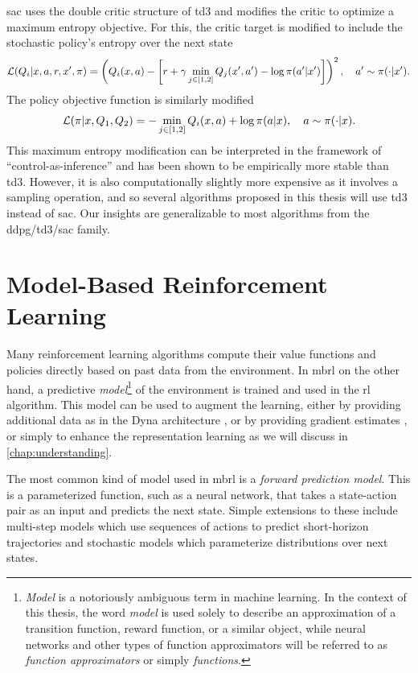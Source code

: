 \ac{sac} uses the double critic structure of \ac{td3} and modifies the critic to optimize a maximum entropy objective.
For this, the critic target is modified to include the stochastic policy's entropy over the next state
\begin{align}
    \mathcal{L}(Q_i| x, a, r, x', \pi) = \left(Q_i(x,a) - \left[r + \gamma \min_{j \in [1,2]}Q_j(x', a') - \log \pi(a'|x')\right]\right)^2, \quad a'\sim\pi(\cdot|x').
\end{align}
The policy objective function is similarly modified
\begin{align}
    \mathcal{L}(\pi| x, Q_1, Q_2) = - \min_{j \in [1,2]} Q_i(x, a) + \log \pi(a|x), \quad a\sim\pi(\cdot|x).
\end{align}
This maximum entropy modification can be interpreted in the framework of ``control-as-inference'' \parencite{levine2018reinforcement} and has been shown to be empirically more stable than \ac{td3}.
However, it is also computationally slightly more expensive as it involves a sampling operation, and so several algorithms proposed in this thesis will use \ac{td3} instead of \ac{sac}.
Our insights are generalizable to most algorithms from the \ac{ddpg}/\ac{td3}/\ac{sac} family.

\section{Model-Based Reinforcement Learning}
\label{sec:model_learning}

Many reinforcement learning algorithms compute their value functions and policies directly based on past data from the environment.
In \ac{mbrl} on the other hand, a predictive \emph{model}\footnote{\emph{Model} is a notoriously ambiguous term in machine learning. In the context of this thesis, the word \emph{model} is used solely to describe an approximation of a transition function, reward function, or a similar object, while neural networks and other types of function approximators will be referred to as \emph{function approximators} or simply \emph{functions}.} of the environment is trained and used in the \ac{rl} algorithm.
This model can be used to augment the learning, either by providing additional data as in the Dyna architecture \parencite{dyna}, or by providing gradient estimates \parencite{hafner2020dream,amos2021model}, or simply to enhance the representation learning as we will discuss in \autoref{chap:understanding}.

The most common kind of model used in \ac{mbrl} is a \emph{forward prediction model}.
This is a parameterized function, such as a neural network, that takes a state-action pair as an input and predicts the next state.
Simple extensions to these include multi-step models which use sequences of actions to predict short-horizon trajectories and stochastic models which parameterize distributions over next states.

